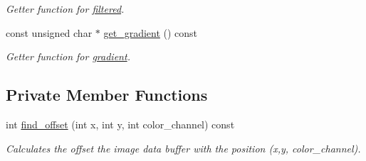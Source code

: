 \begin{DoxyCompactItemize}
\begin{DoxyCompactList}\small\item\em Getter function for \hyperlink{classofeli_1_1_filters_aa4afdd919dfccb08023dee3634b03a30}{filtered}. \end{DoxyCompactList}\item 
\hypertarget{classofeli_1_1_filters_a2c2f355ff0267554a4b2257560fc0085}{const unsigned char $\ast$ \hyperlink{classofeli_1_1_filters_a2c2f355ff0267554a4b2257560fc0085}{get\-\_\-gradient} () const }\label{classofeli_1_1_filters_a2c2f355ff0267554a4b2257560fc0085}

\begin{DoxyCompactList}\small\item\em Getter function for \hyperlink{classofeli_1_1_filters_a9c02bc4005c55eeb5a426485af0d03a9}{gradient}. \end{DoxyCompactList}\end{DoxyCompactItemize}
\subsection*{Private Member Functions}
\begin{DoxyCompactItemize}
\item 
\hypertarget{classofeli_1_1_filters_ac7e55934e49bacdb8dffafa6d60eb948}{int \hyperlink{classofeli_1_1_filters_ac7e55934e49bacdb8dffafa6d60eb948}{find\-\_\-offset} (int x, int y, int color\-\_\-channel) const }\label{classofeli_1_1_filters_ac7e55934e49bacdb8dffafa6d60eb948}

\begin{DoxyCompactList}\small\item\em Calculates the offset the image data buffer with the position ({\itshape x},{\itshape y}, {\itshape color\-\_\-channel}). \end{DoxyCompactList}\end{DoxyCompactItemize}
